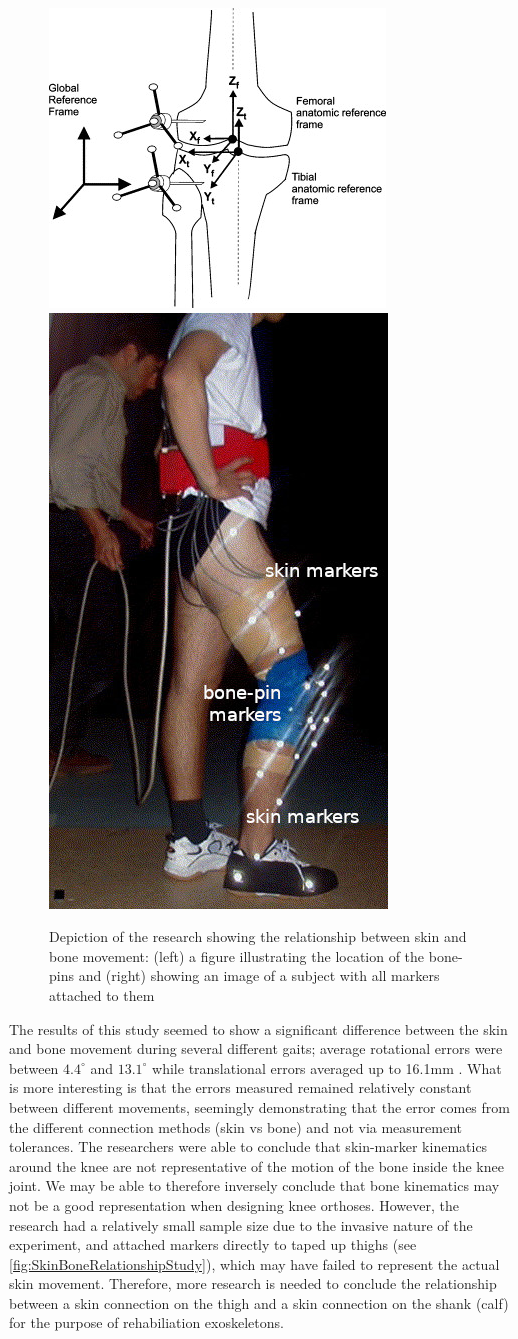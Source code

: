 \begin{figure}[ht!]
    \centering
    \includegraphics[width=0.6\linewidth]{Figures/Background/SkinMovementResearch_Diagram.jpg}
    \includegraphics[width=0.3\linewidth]{Figures/Background/SkinMovementResearch_ImageMarked.jpg}
    \caption{Depiction of the research showing the relationship between skin and bone movement: (left) a figure illustrating the location of the bone-pins and (right) showing an image of a subject with all markers attached to them \cite{SkinMovementKneeKin}}
    \label{fig:SkinBoneRelationshipStudy}
\end{figure}

The results of this study seemed to show a significant difference between the skin and bone movement during several different gaits; average rotational errors were between \(4.4^\circ\) and \(13.1^\circ\) while translational errors averaged up to 16.1mm \cite{SkinMovementKneeKin}. What is more interesting is that the errors measured remained relatively constant between different movements, seemingly demonstrating that the error comes from the different connection methods (skin vs bone) and not via measurement tolerances. The researchers were able to conclude that skin-marker kinematics around the knee are not representative of the motion of the bone inside the knee joint. We may be able to therefore inversely conclude that bone kinematics may not be a good representation when designing knee orthoses. However, the research had a relatively small sample size due to the invasive nature of the experiment, and attached markers directly to taped up thighs (see \autoref{fig:SkinBoneRelationshipStudy}), which may have failed to represent the actual skin movement. Therefore, more research is needed to conclude the relationship between a skin connection on the thigh and a skin connection on the shank (calf) for the purpose of rehabiliation exoskeletons.

